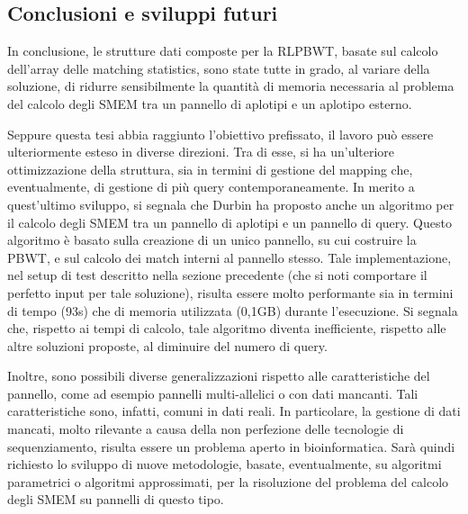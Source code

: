 \documentclass[a4paper,11pt, oneside,italian]{article}
\begin{document}
\subsection*{Conclusioni e sviluppi futuri}
In conclusione, le strutture dati composte per la RLPBWT, basate sul calcolo
dell'array delle matching statistics, sono state tutte in
grado, al variare della soluzione, di ridurre sensibilmente la 
quantità di memoria necessaria al problema del calcolo degli SMEM tra un
pannello di aplotipi e un aplotipo esterno.  

Seppure questa tesi abbia raggiunto l'obiettivo prefissato, il lavoro può essere
ulteriormente esteso in diverse direzioni. Tra di esse, si ha
un'ulteriore ottimizzazione della struttura, sia in termini 
di gestione del mapping che, eventualmente, di gestione di più query
contemporaneamente. In merito a quest'ultimo sviluppo, si segnala che Durbin
ha proposto anche un algoritmo per il calcolo degli SMEM tra un pannello di
aplotipi e un pannello di query. Questo algoritmo è basato sulla creazione di un
unico pannello, su cui 
costruire la PBWT, e sul calcolo dei match interni al pannello stesso. Tale
implementazione, nel setup di test 
descritto nella sezione precedente (che si noti comportare il perfetto input per
tale soluzione), risulta essere molto performante sia in
termini di tempo (93s) che di memoria utilizzata (0,1GB) durante
l'esecuzione. Si segnala che, rispetto ai tempi di calcolo, tale algoritmo
diventa inefficiente, rispetto alle altre soluzioni proposte, al diminuire del
numero di query. 

Inoltre, sono possibili diverse generalizzazioni rispetto alle caratteristiche
del pannello, come ad esempio pannelli multi-allelici o con dati mancanti. Tali
caratteristiche sono, infatti, comuni in dati reali. In particolare, la gestione
di dati 
mancati, molto rilevante a causa della non perfezione delle tecnologie di
sequenziamento, risulta essere un problema aperto in bioinformatica. Sarà
quindi richiesto lo sviluppo di nuove metodologie, basate, eventualmente,
su algoritmi parametrici o algoritmi approssimati, per la risoluzione del
problema del calcolo degli SMEM su pannelli di questo tipo.
\end{document}
